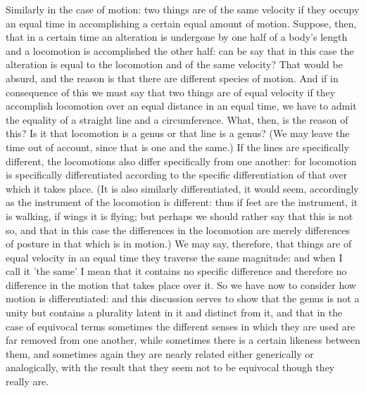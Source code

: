 Similarly in the case of motion: two things are of the same velocity
if they occupy an equal time in accomplishing a certain equal amount
of motion. Suppose, then, that in a certain time an alteration is
undergone by one half of a body's length and a locomotion is accomplished
the other half: can be say that in this case the alteration is equal
to the locomotion and of the same velocity? That would be absurd,
and the reason is that there are different species of motion. And
if in consequence of this we must say that two things are of equal
velocity if they accomplish locomotion over an equal distance in an
equal time, we have to admit the equality of a straight line and a
circumference. What, then, is the reason of this? Is it that locomotion
is a genus or that line is a genus? (We may leave the time out of
account, since that is one and the same.) If the lines are specifically
different, the locomotions also differ specifically from one another:
for locomotion is specifically differentiated according to the specific
differentiation of that over which it takes place. (It is also similarly
differentiated, it would seem, accordingly as the instrument of the
locomotion is different: thus if feet are the instrument, it is walking,
if wings it is flying; but perhaps we should rather say that this
is not so, and that in this case the differences in the locomotion
are merely differences of posture in that which is in motion.) We
may say, therefore, that things are of equal velocity in an equal
time they traverse the same magnitude: and when I call it 'the same'
I mean that it contains no specific difference and therefore no difference
in the motion that takes place over it. So we have now to consider
how motion is differentiated: and this discussion serves to show that
the genus is not a unity but contains a plurality latent in it and
distinct from it, and that in the case of equivocal terms sometimes
the different senses in which they are used are far removed from one
another, while sometimes there is a certain likeness between them,
and sometimes again they are nearly related either generically or
analogically, with the result that they seem not to be equivocal though
they really are. 

